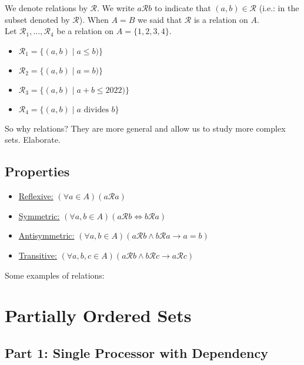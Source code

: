 \documentclass{article}
\begin{document}
    \vspace{1.5mm}
    We denote relations by $\mathcal{R}$. We write $a\mathcal{R} b$ to indicate that $(a,b)\in \mathcal{R}$ (i.e.: in the subset denoted by $\mathcal{R}$). When $A=B$ we said that $\mathcal{R}$ is a relation on $A$.\\
    
    Let $\mathcal{R}_1, \dots, \mathcal{R}_4$ be a relation on $A = \{1, 2, 3, 4\}$.
    \begin{itemize}
        \item $\mathcal{R}_1 = \{(a, b) \mid a \le b)\}$
        \item $\mathcal{R}_2 = \{(a, b) \mid a = b)\}$
        \item $\mathcal{R}_3 = \{(a, b) \mid a+b \le 2022)\}$
        \item $\mathcal{R}_4 = \{(a, b) \mid a \text{ divides } b\}$
    \end{itemize}
    So why relations? They are more general and allow us to study more complex sets. Elaborate. \\
    
\subsection*{Properties}
    
    \begin{itemize}
        \item \underline{Reflexive:} $(\forall a \in A)(a\mathcal{R}a)$
        \item \underline{Symmetric:} $(\forall a, b \in A)(a\mathcal{R}b \iff b\mathcal{R}a)$
        \item \underline{Antisymmetric:} $(\forall a, b\in A)(a\mathcal{R}b \wedge b\mathcal{R}a \rightarrow a=b)$
        \item \underline{Transitive:} $(\forall a, b, c\in A)(a\mathcal{R}b \wedge b\mathcal{R}c \rightarrow a\mathcal{R}c)$
    \end{itemize}

    Some examples of relations:


\section*{Partially Ordered Sets}

\subsection*{Part 1: Single Processor with Dependency}
\end{document}
